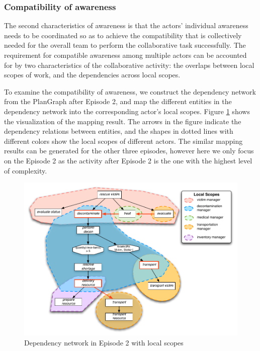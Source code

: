 \subsubsection{Compatibility of awareness} %
\label{ssub:compatibility_of_awareness}
The second characteristics of awareness is that the actors’ individual awareness needs to be coordinated so as to achieve the compatibility that is collectively needed for the overall team to perform the collaborative task successfully. The requirement for compatible awareness among multiple actors can be accounted for by two characteristics of the collaborative activity: the overlaps between local scopes of work, and the dependencies across local scopes.

To examine the compatibility of awareness, we construct the dependency network from the PlanGraph after Episode 2, and map the different entities in the dependency network into the corresponding actor's local scopes. Figure \ref{fig:dependencies_ep2} shows the visualization of the mapping result. The arrows in the figure indicate the dependency relations between entities, and the shapes in dotted lines with different colors show the local scopes of different actors. The similar mapping results can be generated for the other three episodes, however here we only focus on the Episode 2 as the activity after Episode 2 is the one with the highest level of complexity.

\begin{figure}[htbp] %
	\centering
	\includegraphics[width=5.8in]{dependencies_ep2.pdf} 
	\caption{Dependency network in Episode 2 with local scopes}
	\label{fig:dependencies_ep2}
\end{figure}

